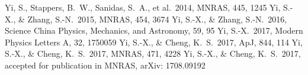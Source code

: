 \documentclass{article}
\begin{document}
\begin{thebibliography}{99}
\footnotesize
{} Yi, S., Stappers, B.~W., Sanidas, S.~A., et al.\ 2014, MNRAS, 445, 1245
 Yi, S.-X., \& Zhang, S.-N.\ 2015, MNRAS, 454, 3674
 Yi, S.-X., \& Zhang, S.-N.\ 2016, Science China Physics, Mechanics, and Astronomy, 59, 95
 Yi, S.-X.\ 2017, Modern Physics Letters A, 32, 1750059
 Yi, S.-X., \& Cheng, K.~S.\ 2017, ApJ, 844, 114
 Yi, S.-X., \& Cheng, K.~S.\ 2017, MNRAS, 471, 4228 
 Yi, S.-X., \& Cheng, K.~S.\ 2017, accepted for publication in MNRAS, arXiv: 1708.09192
\end{thebibliography}
\end{document}
